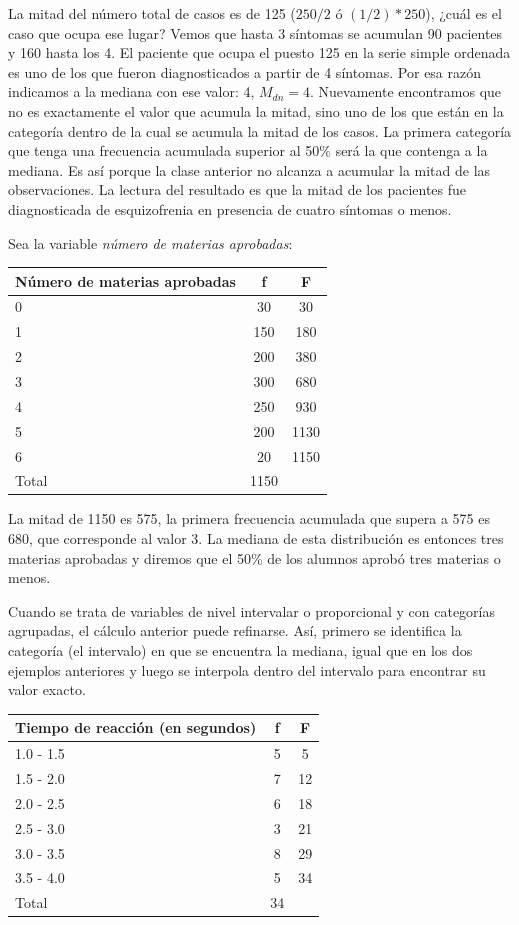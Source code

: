 \documentclass[]{book}
\begin{document}
La mitad del número total de casos es de 125 (\(250/2\) ó \((1/2)*250\)), ¿cuál
es el caso que ocupa ese lugar? Vemos que hasta 3 síntomas se acumulan
90 pacientes y 160 hasta los 4. El paciente que ocupa el puesto 125 en
la serie simple ordenada es uno de los que fueron diagnosticados a
partir de 4 síntomas. Por esa razón indicamos a la mediana con ese
valor: 4, \(M_{dn} = 4\). Nuevamente encontramos que no es exactamente el
valor que acumula la mitad, sino uno de los que están en la categoría
dentro de la cual se acumula la mitad de los casos. La primera categoría
que tenga una frecuencia acumulada superior al 50\% será la que contenga
a la mediana. Es así porque la clase anterior no alcanza a acumular la
mitad de las observaciones. La lectura del resultado es que la mitad de
los pacientes fue diagnosticada de esquizofrenia en presencia de cuatro
síntomas o menos.

Sea la variable \emph{número de materias aprobadas}:

\begin{longtable}[]{@{}lcc@{}}
\toprule
Número de materias aprobadas & f & F\tabularnewline
\midrule
\endhead
0 & 30 & 30\tabularnewline
1 & 150 & 180\tabularnewline
2 & 200 & 380\tabularnewline
3 & 300 & 680\tabularnewline
4 & 250 & 930\tabularnewline
5 & 200 & 1130\tabularnewline
6 & 20 & 1150\tabularnewline
Total & 1150 &\tabularnewline
\bottomrule
\end{longtable}

La mitad de 1150 es 575, la primera frecuencia acumulada que supera a
575 es 680, que corresponde al valor 3. La mediana de esta distribución es entonces tres materias aprobadas y diremos que el 50\% de los alumnos aprobó tres materias o menos.

Cuando se trata de variables de nivel intervalar o proporcional y con
categorías agrupadas, el cálculo anterior puede refinarse. Así, primero se identifica la categoría (el intervalo) en que se encuentra la mediana, igual que en los dos ejemplos anteriores y luego se interpola dentro del intervalo para encontrar su valor exacto.

\begin{longtable}[]{@{}lcc@{}}
\toprule
Tiempo de reacción (en segundos) & f & F\tabularnewline
\midrule
\endhead
1.0 - 1.5 & 5 & 5\tabularnewline
1.5 - 2.0 & 7 & 12\tabularnewline
2.0 - 2.5 & 6 & 18\tabularnewline
2.5 - 3.0 & 3 & 21\tabularnewline
3.0 - 3.5 & 8 & 29\tabularnewline
3.5 - 4.0 & 5 & 34\tabularnewline
Total & 34 &\tabularnewline
\bottomrule
\end{longtable}
\end{document}
